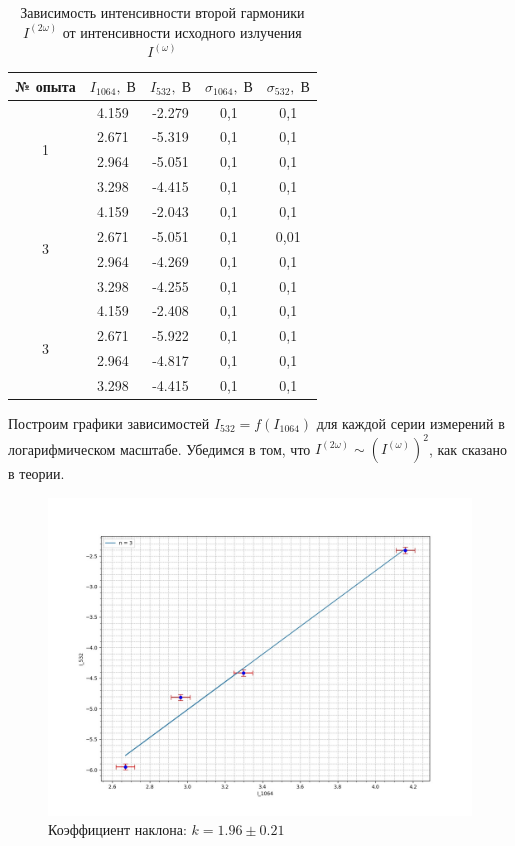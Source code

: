 \documentclass[a4paper,12pt]{article} %
\begin{document}
\begin{enumerate}
\begin{table}[H]
\caption{Зависимость интенсивности второй гармоники $I^{(2\omega)}$ от интенсивности исходного излучения $I^{(\omega)}$}
\begin{center}
\begin{tabular}{|c|c|c|c|c|}
\hline
№ опыта & $I_{1064}, \; В$ & $I_{532}, \; В$ & $\sigma_{1064}, \; В$ & $\sigma_{532}, \; В$ \\ \hline
\multirow{4}{*}{1} & 4.159 & -2.279 & 0,1 & 0,1 \\ \cline{2-5}
& 2.671 & -5.319 & 0,1 & 0,1 \\ \cline{2-5}
& 2.964 & -5.051 & 0,1 & 0,1 \\ \cline{2-5}
& 3.298 & -4.415 & 0,1 & 0,1 \\ \hline
\multirow{4}{*}{3} & 4.159 & -2.043 & 0,1 & 0,1 \\ \cline{2-5}
& 2.671 & -5.051 & 0,1 & 0,01 \\ \cline{2-5}
& 2.964 & -4.269 & 0,1 & 0,1 \\ \cline{2-5}
& 3.298 & -4.255 & 0,1 & 0,1 \\ \hline
\multirow{4}{*}{3} & 4.159 & -2.408 & 0,1 & 0,1 \\ \cline{2-5}
& 2.671 & -5.922 & 0,1 & 0,1 \\ \cline{2-5}
& 2.964 & -4.817 & 0,1 & 0,1 \\ \cline{2-5}
& 3.298 & -4.415 & 0,1 & 0,1 \\ \hline
\end{tabular}
\end{center}
\label{exp1}
\end{table}

Построим графики зависимостей $I_{532} = f (I_{1064})$ для каждой серии измерений в логарифмическом масштабе. Убедимся в том, что $I^{(2 \omega)} \sim (I^{(\omega)})^2$, как сказано в теории.

\begin{figure}[H]
	\label{graf_4}
	\includegraphics[scale=0.3]{1.jpg}
	\caption{Коэффициент наклона: $k = 1.96 \pm 0.21$}
\end{figure}


\end{enumerate}
\end{document}
